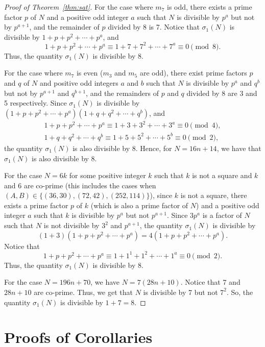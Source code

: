 \documentclass[a4paper,oneside,reqno]{amsart}
\theoremstyle{plain}
\theoremstyle{definition}
\theoremstyle{remark}
\begin{document}
\begin{proof}[Proof of Theorem~\ref{thm:sat}]
		For the case where $m_7$ is odd, there exists a prime factor $p$ of $N$ and a positive odd integer $a$ such that $N$ is divisible by $p^a$ but not by $p^{a+1}$, and the remainder of $p$ divided by 8 is 7. Notice that $\sigma_1(N)$ is divisible by $1+p+p^2+\cdots+p^{a}$, and
		$$1+p+p^2+\cdots+p^{a}\equiv1+7+7^2+\cdots+7^{a}\equiv0\pmod8.$$
		Thus, the quantity $\sigma_1(N)$ is divisible by 8.
		
		For the case where $m_7$ is even ($m_3$ and $m_5$ are odd), there exist prime factors $p$ and $q$ of $N$ and positive odd integers $a$ and $b$ such that $N$ is divisible by $p^a$ and $q^b$ but not by $p^{a+1}$ and $q^{b+1}$, and the remainders of $p$ and $q$ divided by 8 are 3 and 5 respectively. Since $\sigma_1(N)$ is divisible by $(1+p+p^2+\cdots+p^{a})(1+q+q^2+\cdots+q^{b})$, and
		\[\begin{split}
			1+p+p^2+\cdots+p^{a}\equiv1+3+3^2+\cdots+3^{a}\equiv0\pmod4,\\
			1+q+q^2+\cdots+q^{b}\equiv1+5+5^2+\cdots+5^{b}\equiv0\pmod2,
		\end{split}\]
		the quantity $\sigma_1(N)$ is also divisible by 8. Hence, for $N=16n+14$, we have that $\sigma_1(N)$ is also divisible by 8.
		
		For the case $N=6k$ for some positive integer $k$ such that $k$ is not a square and $k$ and 6 are co-prime (this includes the cases when $(A,B)\in\{(36,30),(72,42),(252,114)\}$), since $k$ is not a square, there exists a prime factor $p$ of $k$ (which is also a prime factor of $N$) and a positive odd integer $a$ such that $k$ is divisible by $p^a$ but not $p^{a+1}$. Since $3p^{a}$ is a factor of $N$ such that $N$ is not divisible by $3^2$ and $p^{a+1}$, the quantity $\sigma_1(N)$ is divisible by
		$$(1+3)(1+p+p^2+\cdots+p^{a})=4(1+p+p^2+\cdots+p^{a}).$$
		Notice that
		$$1+p+p^2+\cdots+p^{a}\equiv1+1^1+1^2+\cdots+1^{a}\equiv0\pmod2.$$
		Thus, the quantity $\sigma_1(N)$ is divisible by 8.
		
		For the case $N=196n+70$, we have $N=7(28n+10)$. Notice that 7 and $28n+10$ are co-prime. Thus, we get that $N$ is divisible by 7 but not $7^2$. So, the quantity $\sigma_1(N)$ is divisible by $1+7=8$.
        \end{proof}
		
		\section{Proofs of Corollaries}
		\label{sec:otherresults}
		
		
		
\end{document}
